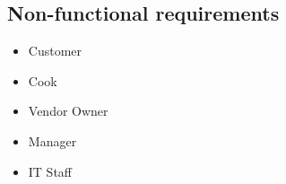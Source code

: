 \subsection{Non-functional requirements}
\begin{itemize}

\item Customer
\begin{itemize}

\end{itemize}

\item Cook
\begin{itemize}

\end{itemize}

\item Vendor Owner
\begin{itemize}

\end{itemize}

\item Manager
\begin{itemize}

\end{itemize}

\item IT Staff
\begin{itemize}

\end{itemize}

\end{itemize}
